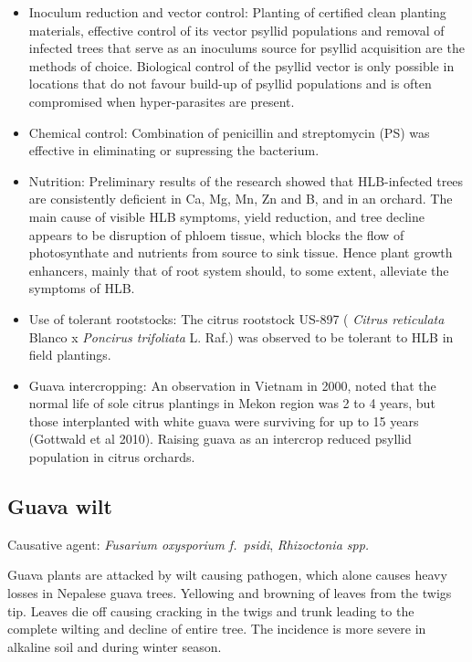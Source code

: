 \documentclass[
]{book}
\begin{document}
\begin{itemize}
\item
  Inoculum reduction and vector control: Planting of certified clean planting materials, effective control of its vector psyllid populations and removal of infected trees that serve as an inoculums source for psyllid acquisition are the methods of choice. Biological control of the psyllid vector is only possible in locations that do not favour build-up of psyllid populations and is often compromised when hyper-parasites are present.
\item
  Chemical control: Combination of penicillin and streptomycin (PS) was effective in eliminating or supressing the bacterium.
\item
  Nutrition: Preliminary results of the research showed that HLB-infected trees are consistently deficient in Ca, Mg, Mn, Zn and B, and in an orchard. The main cause of visible HLB symptoms, yield reduction, and tree decline appears to be disruption of phloem tissue, which blocks the flow of photosynthate and nutrients from source to sink tissue. Hence plant growth enhancers, mainly that of root system should, to some extent, alleviate the symptoms of HLB.
\item
  Use of tolerant rootstocks: The citrus rootstock US-897 ( \emph{Citrus reticulata} Blanco x \emph{Poncirus trifoliata} L. Raf.) was observed to be tolerant to HLB in field plantings.
\item
  Guava intercropping: An observation in Vietnam in 2000, noted that the normal life of sole citrus plantings in Mekon region was 2 to 4 years, but those interplanted with white guava were surviving for up to 15 years (Gottwald et al 2010). Raising guava as an intercrop reduced psyllid population in citrus orchards.
\end{itemize}

\hypertarget{guava-wilt}{%
\subsection{Guava wilt}\label{guava-wilt}}

Causative agent: \emph{Fusarium oxysporium f.~psidi}, \emph{Rhizoctonia spp.}

Guava plants are attacked by wilt causing pathogen, which alone causes heavy losses in Nepalese guava trees. Yellowing and browning of leaves from the twigs tip. Leaves die off causing cracking in the twigs and trunk leading to the complete wilting and decline of entire tree. The incidence is more severe in alkaline soil and during winter season.
\end{document}
